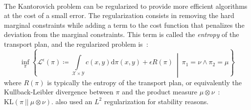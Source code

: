 \documentclass[a4paper,11pt]{article}
\newcommand{\1}{\mathbbm{1}}
\begin{document}
\paragraph{}The Kantorovich problem can be regularized to provide more efficient algorithms at the cost of a small error. The regularization consists in removing the hard marginal constraints while adding a term to the cost function that penalizes the deviation from the marginal constraints. This term is called the \emph{entropy} of the transport plan, and the regularized problem is~:
\begin{equation}
    \label{eq:regularized_kantorovich}
    \inf_{\pi} \left\{\mathcal{L}^{\epsilon}(\pi) \coloneq \int\limits_{\mathcal{X} \times \mathcal{Y}} c(x, y) \mathrm{d}\pi(x, y) + \epsilon R(\pi)~\middle|~\pi_1 = \nu\land\pi_2 = \mu\right\}
\end{equation}
where $R(\pi)$ is typically the entropy of the transport plan, or equivalently the Kullback-Leibler divergence between $\pi$ and the product measure $\mu \otimes \nu$~: $\mathrm{KL}(\pi~||~\mu \otimes \nu)$. \citet{seguy2018largescaleoptimaltransportmapping} also used an $L^2$ regularization for stability reasons.
\end{document}
